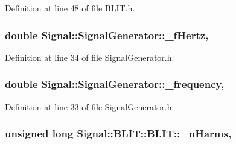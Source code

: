 Definition at line 48 of file B\+L\+I\+T.\+h.

\hypertarget{class_signal_1_1_signal_generator_a85a4702347352bab1c71e0a8df8437d6}{
\subsubsection[{\+\_\+f\+Hertz}]{\setlength{\rightskip}{0pt plus 5cm}double Signal\+::\+Signal\+Generator\+::\+\_\+f\+Hertz\hspace{0.3cm}{\ttfamily [protected]}, {\ttfamily [inherited]}}}\label{class_signal_1_1_signal_generator_a85a4702347352bab1c71e0a8df8437d6}


Definition at line 34 of file Signal\+Generator.\+h.

\hypertarget{class_signal_1_1_signal_generator_a7f107461333bce68c5dad412db96a8c2}{
\subsubsection[{\+\_\+frequency}]{\setlength{\rightskip}{0pt plus 5cm}double Signal\+::\+Signal\+Generator\+::\+\_\+frequency\hspace{0.3cm}{\ttfamily [protected]}, {\ttfamily [inherited]}}}\label{class_signal_1_1_signal_generator_a7f107461333bce68c5dad412db96a8c2}


Definition at line 33 of file Signal\+Generator.\+h.

\hypertarget{class_signal_1_1_b_l_i_t_1_1_b_l_i_t_a0bfbf4e7515a42fab7df748b8497f648}{
\subsubsection[{\+\_\+n\+Harms}]{\setlength{\rightskip}{0pt plus 5cm}unsigned long Signal\+::\+B\+L\+I\+T\+::\+B\+L\+I\+T\+::\+\_\+n\+Harms\hspace{0.3cm}{\ttfamily [protected]}, {\ttfamily [inherited]}}}\label{class_signal_1_1_b_l_i_t_1_1_b_l_i_t_a0bfbf4e7515a42fab7df748b8497f648}


